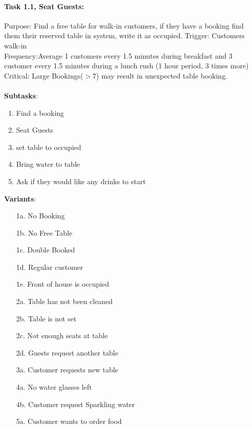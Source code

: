 \documentclass{article}
\begin{document}
\paragraph{Task 1.1, Seat Guests:}
Purpose: Find a free table for walk-in customers, if they have a booking find them their reserved table in system, write it as occupied.
Trigger: Customers walk-in \\
Frequency:Average 1 customers every 1.5 minutes during breakfast and 3 customer every 1.5 minutes during a lunch rush (1 hour period, 3 times more) \\
Critical: Large Bookings($>$7) may result in unexpected table booking.\\
\\
\textbf{Subtasks}:
\begin{enumerate}
    \item Find a booking
    \item Seat Guests
    \item set table to occupied
    \item Bring water to table
    \item Ask if they would like any drinks to start
\end{enumerate}
\textbf{Variants}:
\begin{enumerate}
    \item [1a.] No Booking
    \item [1b.] No Free Table
    \item [1c.] Double Booked
    \item [1d.] Regular customer
    \item [1e.] Front of house is occupied 
    \item [2a.] Table has not been cleaned
    \item [2b.] Table is not set
    \item [2c.] Not enough seats at table
    \item [2d.] Guests request another table
    \item [3a.] Customer requests new table
    \item [4a.] No water glasses left
    \item [4b.] Customer request Sparkling water
    \item [5a.] Customer wants to order food
\end{enumerate}
\end{document}
